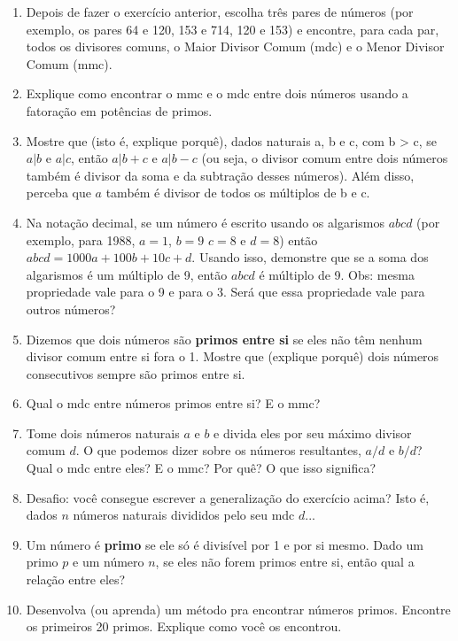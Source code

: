 \documentclass{article}
\begin{document}
\begin{enumerate}
	\item Depois de fazer o exercício anterior, escolha três pares de números (por exemplo, os pares 64 e 120, 153 e 714,
		120 e 153) e encontre, para cada par, todos os divisores comuns, o Maior Divisor Comum (mdc) e o Menor Divisor
		Comum (mmc).
		
	\item Explique como encontrar o mmc e o mdc entre dois números usando a fatoração em potências de primos.

	\item Mostre que (isto é, explique porquê), 
		dados naturais a, b e c, com b > c, se $a|b$ e $a|c$, então $a|b+c$ e $a|b-c$ (ou seja, o divisor
		comum entre dois números também é divisor da soma e da subtração desses números). Além disso, perceba que
		$a$ também é divisor de todos os múltiplos de b e c.

	\item Na notação decimal, se um número é escrito usando os algarismos $abcd$ (por exemplo, para 1988, $a = 1$, $b=9$
		$c = 8$ e $d=8$) então $abcd = 1000a + 100b + 10c + d$. Usando isso, demonstre que se a soma dos algarismos
		é um múltiplo de 9, então $abcd$ é múltiplo de 9. Obs:  mesma propriedade vale para o 9 e para o 3. 
		Será que essa propriedade vale para outros números?

	\item Dizemos que dois números são {\bf primos entre si} se eles não têm nenhum divisor comum entre si fora o 1.
		Mostre que (explique porquê) dois números consecutivos sempre são primos entre si.

	\item Qual o mdc entre números primos entre si? E o mmc?

	\item Tome dois números naturais $a$ e $b$ e divida eles por seu máximo divisor comum $d$. O que podemos dizer sobre
		os números resultantes, $a/d$ e $b/d$? Qual o mdc entre eles? E o mmc? Por quê? O que isso significa?

	\item Desafio: você consegue escrever a generalização do exercício acima? Isto é, dados $n$ números naturais
		divididos pelo seu mdc $d$...

	\item Um número é {\bf primo} se ele só é divisível por 1 e por si mesmo. Dado um primo $p$ e um número $n$,
		se eles não forem primos entre si, então qual a relação entre eles?

	\item Desenvolva (ou aprenda) um método pra encontrar números primos. Encontre os primeiros 20 primos. Explique
		como você os encontrou.


\end{enumerate}
\end{document}

